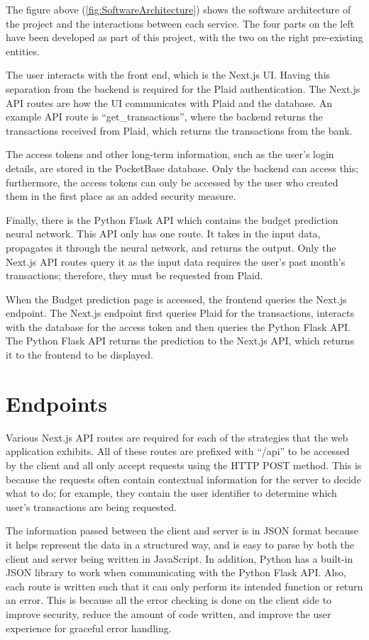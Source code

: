 The figure above (\ref{fig:SoftwareArchitecture}) shows the software architecture of the project and the interactions between each service. The four parts on the left have been developed as part of this project, with the two on the right pre-existing entities.

The user interacts with the front end, which is the Next.js UI. Having this separation from the backend is required for the Plaid authentication. The Next.js API routes are how the UI communicates with Plaid and the database. An example API route is ``get\_transactions'', where the backend returns the transactions received from Plaid, which returns the transactions from the bank.

The access tokens and other long-term information, such as the user's login details, are stored in the PocketBase database. Only the backend can access this; furthermore, the access tokens can only be accessed by the user who created them in the first place as an added security measure.

Finally, there is the Python Flask API which contains the budget prediction neural network. This API only has one route. It takes in the input data, propagates it through the neural network, and returns the output. Only the Next.js API routes query it as the input data requires the user's past month's transactions; therefore, they must be requested from Plaid.

When the Budget prediction page is accessed, the frontend queries the Next.js endpoint. The Next.js endpoint first queries Plaid for the transactions, interacts with the database for the access token and then queries the Python Flask API. The Python Flask API returns the prediction to the Next.js API, which returns it to the frontend to be displayed.

\section{Endpoints}
\label{sec:endpoints}
Various Next.js API routes are required for each of the strategies that the web application exhibits. All of these routes are prefixed with ``/api'' to be accessed by the client and all only accept requests using the HTTP POST method. This is because the requests often contain contextual information for the server to decide what to do; for example, they contain the user identifier to determine which user's transactions are being requested.

The information passed between the client and server is in JSON format because it helps represent the data in a structured way, and is easy to parse by both the client and server being written in JavaScript. In addition, Python has a built-in JSON library to work when communicating with the Python Flask API. Also, each route is written such that it can only perform its intended function or return an error. This is because all the error checking is done on the client side to improve security, reduce the amount of code written, and improve the user experience for graceful error handling.

